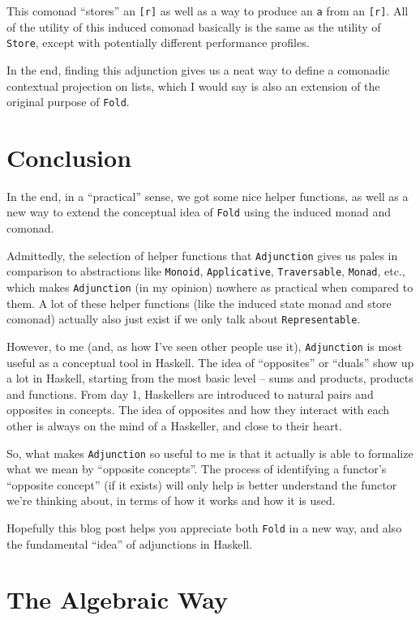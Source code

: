 \documentclass[]{article}
\begin{document}
This comonad ``stores'' an \texttt{{[}r{]}} as well as a way to produce an
\texttt{a} from an \texttt{{[}r{]}}. All of the utility of this induced comonad
basically is the same as the utility of \texttt{Store}, except with potentially
different performance profiles.

In the end, finding this adjunction gives us a neat way to define a comonadic
contextual projection on lists, which I would say is also an extension of the
original purpose of \texttt{Fold}.

\section{Conclusion}\label{conclusion}

In the end, in a ``practical'' sense, we got some nice helper functions, as well
as a new way to extend the conceptual idea of \texttt{Fold} using the induced
monad and comonad.

Admittedly, the selection of helper functions that \texttt{Adjunction} gives us
pales in comparison to abstractions like \texttt{Monoid}, \texttt{Applicative},
\texttt{Traversable}, \texttt{Monad}, etc., which makes \texttt{Adjunction} (in
my opinion) nowhere as practical when compared to them. A lot of these helper
functions (like the induced state monad and store comonad) actually also just
exist if we only talk about \texttt{Representable}.

However, to me (and, as how I've seen other people use it), \texttt{Adjunction}
is most useful as a conceptual tool in Haskell. The idea of ``opposites'' or
``duals'' show up a lot in Haskell, starting from the most basic level -- sums
and products, products and functions. From day 1, Haskellers are introduced to
natural pairs and opposites in concepts. The idea of opposites and how they
interact with each other is always on the mind of a Haskeller, and close to
their heart.

So, what makes \texttt{Adjunction} so useful to me is that it actually is able
to formalize what we mean by ``opposite concepts''. The process of identifying a
functor's ``opposite concept'' (if it exists) will only help is better
understand the functor we're thinking about, in terms of how it works and how it
is used.

Hopefully this blog post helps you appreciate both \texttt{Fold} in a new way,
and also the fundamental ``idea'' of adjunctions in Haskell.

\section{The Algebraic Way}\label{the-algebraic-way}
\end{document}
